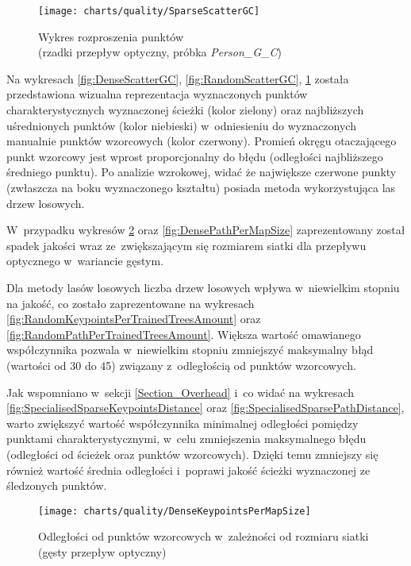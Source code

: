     \newpage
      \begin{figure}[!ht]
        \centering
        \texttt{[image: charts/quality/SparseScatterGC]}
        \caption[Wykres rozproszenia punktów (rzadki przepływ optyczny)]
                {Wykres rozproszenia punktów\\(rzadki przepływ optyczny, próbka \textit{Person\_G\_C})}
        \label{fig:SparseScatterGC}
      \end{figure}

    Na wykresach \ref{fig:DenseScatterGC}, \ref{fig:RandomScatterGC}, \ref{fig:SparseScatterGC} została przedstawiona wizualna reprezentacja wyznaczonych punktów charakterystycznych wyznaczonej ścieżki (kolor zielony) oraz najbliższych uśrednionych punktów (kolor niebieski) w~odniesieniu do wyznaczonych manualnie punktów wzorcowych (kolor czerwony). Promień okręgu otaczającego punkt wzorcowy jest wprost proporcjonalny do błędu (odległości najbliższego średniego punktu). Po analizie wzrokowej, widać że największe czerwone punkty (zwłaszcza na boku wyznaczonego kształtu) posiada metoda wykorzystująca las drzew losowych.

    W~przypadku wykresów \ref{fig:DenseKeypointsPerMapSize} oraz \ref{fig:DensePathPerMapSize} zaprezentowany został spadek jakości wraz ze~zwiększającym się rozmiarem siatki dla przepływu optycznego w~wariancie gęstym.

    Dla metody lasów losowych liczba drzew losowych wpływa w~niewielkim stopniu na jakość, co zostało zaprezentowane na wykresach \ref{fig:RandomKeypointsPerTrainedTreesAmount} oraz \ref{fig:RandomPathPerTrainedTreesAmount}. Większa wartość omawianego współczynnika pozwala w~niewielkim stopniu zmniejszyć maksymalny błąd (wartości od 30 do 45) związany z~odległością od punktów wzorcowych.

    Jak wspomniano w~sekcji \ref{Section_Overhead} i~co widać na wykresach \ref{fig:SpecialisedSparseKeypointsDistance} oraz \ref{fig:SpecialisedSparsePathDistance}, warto zwiększyć wartość współczynnika minimalnej odległości pomiędzy punktami charakterystycznymi, w~celu zmniejszenia maksymalnego błędu (odległości od ścieżek oraz punktów wzorcowych). Dzięki temu zmniejszy się również wartość średnia odległości i~poprawi jakość ścieżki wyznaczonej ze śledzonych punktów.

      \begin{figure}[!ht]
        \centering
        \texttt{[image: charts/quality/DenseKeypointsPerMapSize]}
        \caption[Odległości od punktów wzorcowych w~zależności od rozmiaru siatki]
                {Odległości od punktów wzorcowych w~zależności od rozmiaru siatki (gęsty przepływ optyczny)}
        \label{fig:DenseKeypointsPerMapSize}
      \end{figure}

